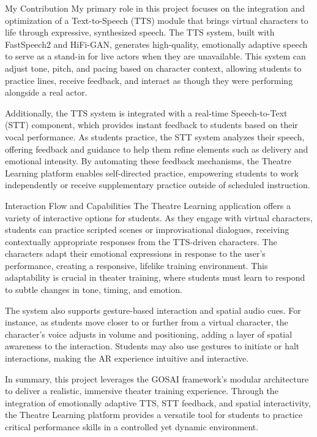 My Contribution
My primary role in this project focuses on the integration and optimization of a Text-to-Speech (TTS) module that brings virtual characters to life through expressive, synthesized speech. The TTS system, built with FastSpeech2 and HiFi-GAN, generates high-quality, emotionally adaptive speech to serve as a stand-in for live actors when they are unavailable. This system can adjust tone, pitch, and pacing based on character context, allowing students to practice lines, receive feedback, and interact as though they were performing alongside a real actor.

Additionally, the TTS system is integrated with a real-time Speech-to-Text (STT) component, which provides instant feedback to students based on their vocal performance. As students practice, the STT system analyzes their speech, offering feedback and guidance to help them refine elements such as delivery and emotional intensity. By automating these feedback mechanisms, the Theatre Learning platform enables self-directed practice, empowering students to work independently or receive supplementary practice outside of scheduled instruction.

Interaction Flow and Capabilities
The Theatre Learning application offers a variety of interactive options for students. As they engage with virtual characters, students can practice scripted scenes or improvisational dialogues, receiving contextually appropriate responses from the TTS-driven characters. The characters adapt their emotional expressions in response to the user’s performance, creating a responsive, lifelike training environment. This adaptability is crucial in theater training, where students must learn to respond to subtle changes in tone, timing, and emotion.

The system also supports gesture-based interaction and spatial audio cues. For instance, as students move closer to or further from a virtual character, the character’s voice adjusts in volume and positioning, adding a layer of spatial awareness to the interaction. Students may also use gestures to initiate or halt interactions, making the AR experience intuitive and interactive.

In summary, this project leverages the GOSAI framework’s modular architecture to deliver a realistic, immersive theater training experience. Through the integration of emotionally adaptive TTS, STT feedback, and spatial interactivity, the Theatre Learning platform provides a versatile tool for students to practice critical performance skills in a controlled yet dynamic environment.

